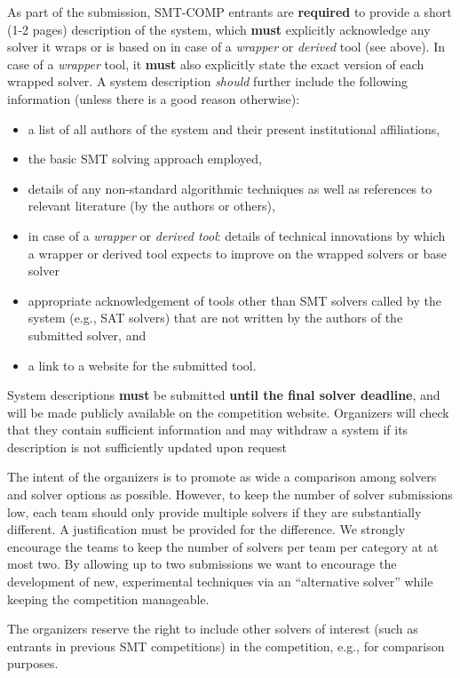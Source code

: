 \documentclass[12pt]{article}
\begin{document}
%
As part of the submission, SMT-COMP entrants are \textbf{required} to provide a
short (1-2 pages) description of the system, which \textbf{must} explicitly
acknowledge any solver it wraps or is based on in case of a \emph{wrapper} or
\emph{derived} tool (see above).
In case of a \emph{wrapper} tool, it \textbf{must} also explicitly state
the exact version of each wrapped solver.
A system description \emph{should} further include the following information
(unless there is a good reason otherwise):
\begin{itemize}[itemsep=0ex]
  \item a list of all authors of the system and their present institutional
    affiliations,
  \item the basic SMT solving approach employed,
  \item details of any non-standard algorithmic techniques as well as
    references to relevant literature (by the authors or others),
  \item in case of a \emph{wrapper} or \emph{derived tool}: details of
    technical innovations by which a wrapper or derived tool expects to improve
    on the wrapped solvers or base solver
  \item appropriate acknowledgement of tools other than SMT solvers called by
    the system (e.g., SAT solvers) that are not written by the authors of the
    submitted solver, and
  \item a link to a website for the submitted tool.
\end{itemize}
System descriptions \textbf{must} be submitted \textbf{until the final solver
deadline}, and will be made publicly available on the competition website.
Organizers will check that they contain sufficient information
and may withdraw a system if its description is not sufficiently updated upon
request

%
The intent of the organizers is to promote as wide a comparison among
solvers and solver options as possible.  However, to keep the number of
solver submissions low, each team should only provide multiple solvers
if they are  substantially different.  A justification must be provided
for the difference.  We strongly encourage the teams to keep the number
of solvers per team per category at at most two. By allowing
up to two submissions we want to encourage the development of new,
experimental techniques via an ``alternative solver'' while keeping
the competition manageable.

%
The organizers reserve the right to include other solvers of interest
(such as entrants in previous SMT competitions) in the competition,
e.g., for comparison purposes.
\end{document}
